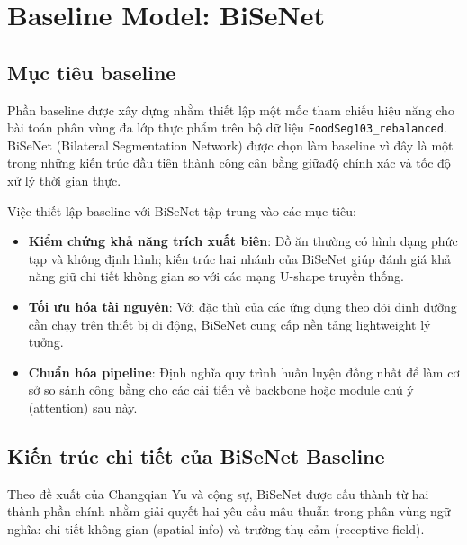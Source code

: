 \section{Baseline Model: BiSeNet}

\subsection{Mục tiêu baseline}
Phần baseline được xây dựng nhằm thiết lập một mốc tham chiếu hiệu năng cho bài toán phân vùng đa lớp thực phẩm trên bộ dữ liệu \texttt{FoodSeg103\_rebalanced}. BiSeNet (Bilateral Segmentation Network) được chọn làm baseline vì đây là một trong những kiến trúc đầu tiên thành công cân bằng giữađộ chính xác và tốc độ xử lý thời gian thực.

Việc thiết lập baseline với BiSeNet tập trung vào các mục tiêu:
\begin{itemize}[leftmargin=1.5em]
    \item \textbf{Kiểm chứng khả năng trích xuất biên}: Đồ ăn thường có hình dạng phức tạp và không định hình; kiến trúc hai nhánh của BiSeNet giúp đánh giá khả năng giữ chi tiết không gian so với các mạng U-shape truyền thống.
    \item \textbf{Tối ưu hóa tài nguyên}: Với đặc thù của các ứng dụng theo dõi dinh dưỡng cần chạy trên thiết bị di động, BiSeNet cung cấp nền tảng lightweight lý tưởng.
    \item \textbf{Chuẩn hóa pipeline}: Định nghĩa quy trình huấn luyện đồng nhất để làm cơ sở so sánh công bằng cho các cải tiến về backbone hoặc module chú ý (attention) sau này.
\end{itemize}

\subsection{Kiến trúc chi tiết của BiSeNet Baseline}
Theo đề xuất của Changqian Yu và cộng sự, BiSeNet được cấu thành từ hai thành phần chính nhằm giải quyết hai yêu cầu mâu thuẫn trong phân vùng ngữ nghĩa: chi tiết không gian (spatial info) và trường thụ cảm (receptive field).

